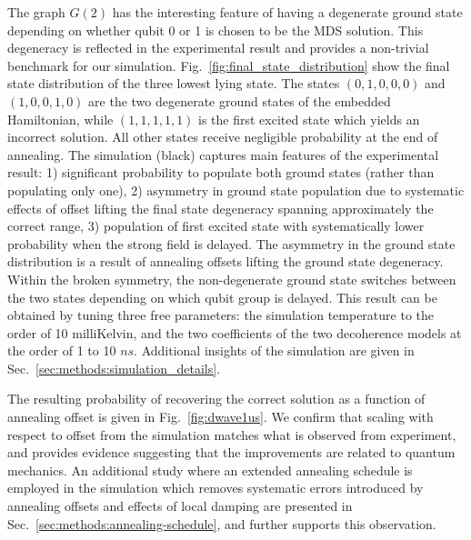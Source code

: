 \documentclass[prd,twocolumn,tightenlines,preprintnumbers,showpacs,superscriptaddress,notitlepage,nofootinbib,eqsecnum,floatfix,longbibliography,aps,10pt]{revtex4-2}
\begin{document}
The graph $G(2)$ has the interesting feature of having a degenerate ground state depending on whether qubit 0 or 1 is chosen to be the MDS solution.
This degeneracy is reflected in the experimental result and provides a non-trivial benchmark for our simulation.
Fig.~\ref{fig:final_state_distribution} show the final state distribution of the three lowest lying state.
The states $(0, 1, 0, 0, 0)$ and $(1, 0, 0, 1, 0)$ are the two degenerate ground states of the embedded Hamiltonian, while $(1, 1, 1, 1, 1)$ is the first excited state which yields an incorrect solution.
All other states receive negligible probability at the end of annealing.
The simulation (black) captures main features of the experimental result: 1) significant probability to populate both ground states (rather than populating only one), 2) asymmetry in ground state population due to systematic effects of offset lifting the final state degeneracy spanning approximately the correct range, 3) population of first excited state with systematically lower probability when the strong field is delayed.
The asymmetry in the ground state distribution is a result of annealing offsets lifting the ground state degeneracy. Within the broken symmetry, the non-degenerate ground state switches between the two states depending on which qubit group is delayed.
This result can be obtained by tuning three free parameters: the simulation temperature to the order of 10 milliKelvin, and the two coefficients of the two decoherence models at the order of 1 to 10 $ns$.
Additional insights of the simulation are given in Sec.~\ref{sec:methods:simulation_details}.

The resulting probability of recovering the correct solution as a function of annealing offset is given in Fig.~\ref{fig:dwave1us}.
We confirm that scaling with respect to offset from the simulation matches what is observed from experiment, and provides evidence suggesting that the improvements are related to quantum mechanics.
An additional study where an extended annealing schedule is employed in the simulation which removes systematic errors introduced by annealing offsets and effects of local damping are presented in Sec.~\ref{sec:methods:annealing-schedule}, and further supports this observation.
\end{document}
